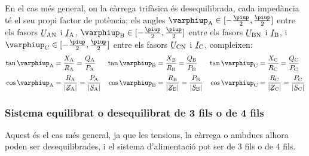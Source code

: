 \begin{center}
    
    \label{pic:pot_comp_trif}
\end{center}

En el cas més general, on la càrrega trifàsica és desequilibrada,
cada impedància té el seu propi factor de potència; els angles
$\varphiup\ped{A}\in[-\frac{\piup}{2},\frac{\piup}{2}]$ entre els fasors $\cmplx{U}\ped{AN}$ i $\cmplx{I}\ped{A}$, $\varphiup\ped{B}\in[-\frac{\piup}{2},\frac{\piup}{2}]$ entre els fasors $\cmplx{U}\ped{BN}$ i $\cmplx{I}\ped{B}$, i $\varphiup\ped{C}\in[-\frac{\piup}{2},\frac{\piup}{2}]$ entre els fasors $\cmplx{U}\ped{CN}$ i $\cmplx{I}\ped{C}$, compleixen:
\begin{subequations}
\begin{align}
    \tan\varphiup\ped{A} &= \frac{X\ped{A}}{R\ped{A}} = \frac{Q\ped{A}}{P\ped{A}} &
    \tan\varphiup\ped{B} &= \frac{X\ped{B}}{R\ped{B}} = \frac{Q\ped{B}}{P\ped{B}} &
    \tan\varphiup\ped{C} &= \frac{X\ped{C}}{R\ped{C}} = \frac{Q\ped{C}}{P\ped{C}} \\[0.5ex]
    \cos\varphiup\ped{A} &= \frac{R\ped{A}}{|\cmplx{Z}\ped{A}|} = \frac{P\ped{A}}{|\cmplx{S}\ped{A}|} &
    \cos\varphiup\ped{B} &= \frac{R\ped{B}}{|\cmplx{Z}\ped{B}|} = \frac{P\ped{B}}{|\cmplx{S}\ped{B}|} &
    \cos\varphiup\ped{C} &= \frac{R\ped{C}}{|\cmplx{Z}\ped{C}|} = \frac{P\ped{C}}{|\cmplx{S}\ped{C}|}
\end{align}
\end{subequations}

\subsubsection{Sistema equilibrat o desequilibrat de 3 fils o de 4 fils}

Aquest és el cas més general, ja que les tensions, la càrrega o
ambdues alhora  poden ser desequilibrades, i el sistema
d'alimentació pot ser de 3 fils o de 4 fils.

